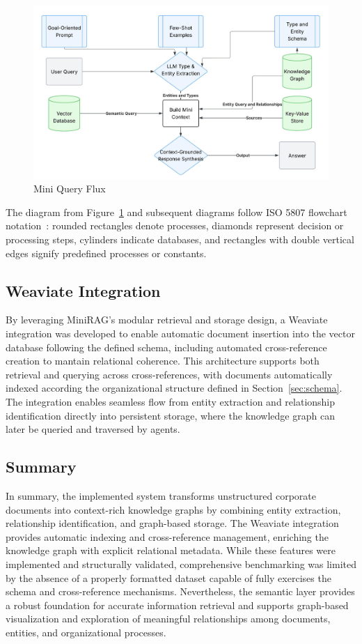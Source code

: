 \begin{figure}
    \centering
    \includegraphics[width=0.75\linewidth]{Images/Fluxograma_Mini_Query.jpeg}
    \caption{Mini Query Flux}\label{fig:mini-query-flux}
\end{figure}

The diagram from Figure~\ref{fig:mini-query-flux} and subsequent diagrams follow ISO 5807 flowchart notation~\cite{iso5807}: rounded rectangles denote processes, diamonds represent decision or processing steps, cylinders indicate databases, and rectangles with double vertical edges signify predefined processes or constants.

\subsection{Weaviate Integration}

By leveraging MiniRAG's modular retrieval and storage design, a Weaviate integration was developed to enable automatic document insertion into the vector database following the defined schema, including automated cross-reference creation to mantain relational coherence. This architecture supports both retrieval and querying across cross-references, with documents automatically indexed according the organizational structure defined in Section~\ref{sec:schema}. The integration enables seamless flow from entity extraction and relationship identification directly into persistent storage, where the knowledge graph can later be queried and traversed by agents.

\subsection{Summary}

In summary, the implemented system transforms unstructured corporate documents into context-rich knowledge graphs by combining entity extraction, relationship identification, and graph-based storage. The Weaviate integration provides automatic indexing and cross-reference management, enriching the knowledge graph with explicit relational metadata. While these features were implemented and structurally validated, comprehensive benchmarking was limited by the absence of a properly formatted dataset capable of fully exercises the schema and cross-reference mechanisms. Nevertheless, the semantic layer provides a robust foundation for accurate information retrieval and supports graph-based visualization and exploration of meaningful relationships among documents, entities, and organizational processes.

